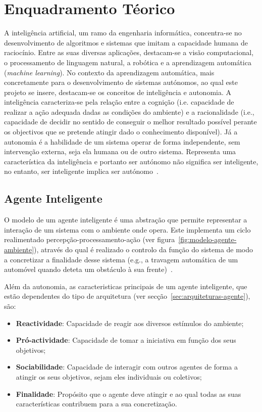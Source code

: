 \chapter{Enquadramento Téorico}\label{ch:enquadramento-teorico}

A inteligência artificial, um ramo da engenharia informática, concentra-se no desenvolvimento de algoritmos e sistemas que imitam a capacidade humana de raciocínio.
Entre as suas diversas aplicações, destacam-se a visão computacional, o processamento de linguagem natural, a robótica e a aprendizagem automática (\textit{machine learning}).
No contexto da aprendizagem automática, mais concretamente para o desenvolvimento de sistemas autónomos, ao qual este projeto se insere, destacam-se os conceitos de inteligência e autonomia.
A inteligência caracteriza-se pela relação entre a cognição (i.e. capacidade de realizar a ação adequada dadas as condições do ambiente) e a racionalidade (i.e., capacidade de decidir no sentido de conseguir o melhor resultado possível perante os objectivos que se pretende atingir dado o conhecimento disponível).
Já a autonomia é a habilidade de um sistema operar de forma independente, sem intervenção externa, seja ela humana ou de outro sistema.
Representa uma característica da inteligência e portanto ser autónomo não significa ser inteligente, no entanto, ser inteligente implica ser autónomo~\cite{isel:iasa:slides:ia-intro}.


\section{Agente Inteligente}\label{sec:agente-inteligente}
O modelo de um agente inteligente é uma abstração que permite representar a interação de um sistema com o ambiente onde opera.
Este implementa um ciclo realimentado percepção-processamento-ação (ver figura~\ref{fig:modelo-agente-ambiente}), através do qual é realizado o controlo da função do sistema de modo a concretizar a finalidade desse sistema (e.g., a travagem automática de um automóvel quando deteta um obstáculo à sua frente)~\cite{isel:iasa:slides:ia-intro}.

Além da autonomia, as caracteristicas principais de um agente inteligente, que estão dependentes do tipo de arquitetura (ver secção~\ref{sec:arquiteturas-agente}), são:

\begin{itemize}
    \item \textbf{Reactividade}: Capacidade de reagir aos diversos estímulos do ambiente;
    \item \textbf{Pró-actividade}: Capacidade de tomar a iniciativa em função dos seus objetivos;
    \item \textbf{Sociabilidade}: Capacidade de interagir com outros agentes de forma a atingir os seus objetivos, sejam eles individuais ou coletivos;
    \item \textbf{Finalidade}: Propósito que o agente deve atingir e ao qual todas as suas características contribuem para a sua concretização.
\end{itemize}

